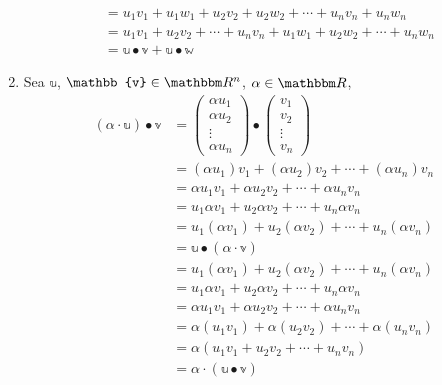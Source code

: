 \begin{proposition}
\begin{enumerate}[label=\roman*)]
\begin{align*}
            & = u_1v_1 + u_1w_1 + u_2v_2 + u_2w_2 + \cdots + u_nv_n + u_nw_n \\
            & = u_1v_1 + u_2v_2 + \cdots + u_nv_n + u_1w_1 + u_2w_2 + \cdots + u_nw_n \\
            & = \mathbb{u} \bullet \mathbb{v} + \mathbb{u} \bullet \mathbb{w}
        \end{align*}
        \item Sea $\mathbb{u}$, $\mathbb{v} \in \RR[n]$, $\alpha \in \RR$,
        \begin{align*}
            (\alpha \cdot \mathbb{u}) \bullet \mathbb{v} & = \begin{pmatrix}
                \alpha u_1 \\
                \alpha u_2 \\
                \vdots \\
                \alpha u_n
            \end{pmatrix} \bullet \begin{pmatrix}
                v_1 \\
                v_2 \\
                \vdots \\
                v_n
            \end{pmatrix} \\
            & = (\alpha u_1)v_1 + (\alpha u_2)v_2 + \cdots + (\alpha u_n)v_n \\
            & = \alpha u_1v_1 + \alpha u_2v_2 + \cdots + \alpha u_nv_n \\
            & = u_1\alpha v_1 + u_2\alpha v_2 + \cdots + u_n\alpha v_n \\
            & = u_1(\alpha v_1) + u_2(\alpha v_2) + \cdots + u_n(\alpha v_n) \\
            & = \mathbb{u} \bullet (\alpha \cdot \mathbb{v}) \\
            & = u_1(\alpha v_1) + u_2(\alpha v_2) + \cdots + u_n(\alpha v_n) \\
            & = u_1\alpha v_1 + u_2\alpha v_2 + \cdots + u_n\alpha v_n \\
            & = \alpha u_1v_1 + \alpha u_2v_2 + \cdots + \alpha u_nv_n \\
            & = \alpha (u_1v_1) + \alpha (u_2v_2) + \cdots + \alpha (u_nv_n) \\
            & = \alpha \left( u_1v_1 + u_2v_2 + \cdots + u_nv_n \right) \\
            & = \alpha \cdot (\mathbb{u} \bullet \mathbb{v})
        \end{align*}
    \end{enumerate}
\end{proposition}

